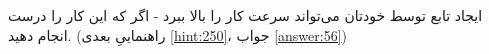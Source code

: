 \section{}
\paragraph{}\label{hint:305}
ایجاد تابع  توسط خودتان می‌تواند سرعت کار را بالا ببرد - اگر که این کار را درست انجام دهید. (راهنماییِ بعدی \ref{hint:250}، جواب \ref{answer:56})